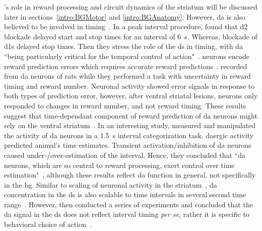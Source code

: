 's role in reward processing and circuit dynamics of the striatum will be discussed later in sections~\ref{intro:BGMotor} and \ref{intro:BGAnatomy}.
However, \gls{da} is also believed to be involved in timing~\cite{Paton2018NeuronRev}.
In a peak interval procedure\footnotemark,  found that \gls{d2} blockade delayed start and stop times for an interval of 6~s.
Whereas, blockade of \glspl{d1} delayed stop times.
Then they stress the role of the \gls{ds} in timing, with \gls{da} ``being particularly critical for the temporal control of action"~\cite{DeCorte2019}.
 neurons encode reward prediction errors which requires accurate reward predictions~\cite[see][]{Berke2018NN}.
 recorded from \gls{da} neurons of rats while they performed a task with uncertainty in reward timing and reward number.
Neuronal activity showed error signals in response to both types of prediction error, however, after ventral striatal lesions, neurons only responded to changes in reward number, and not reward timing.
These results suggest that time-dependant component of reward prediction of \gls{da} neurons might rely on the ventral striatum~\cite{Takahashi2016}.
In an interesting study,  measured and manipulated the activity of \gls{da} neurons in a 1.5~s interval categorization task.
\Gls{da}ergic activity predicted animal's time estimates.
Transient activation/inhibition of \gls{da} neurons caused under-/over-estimation of the interval.
Hence, they concluded that ``\gls{da} neurons, which are so central to reward processing, exert control over time estimation"~\cite{Paton2016Sci}, although these results reflect \gls{da} function in general, not specifically in the \gls{bg}.
Similar to scaling of neuronal activity in the striatum~\cite{Mello2015}, \gls{da} concentration in the \gls{ds} is also scalable to time intervals in several second time range~\cite{Howard2017}.
However, \citeauthor{Howard2017} then conducted a series of experiments and concluded that the \gls{da} signal in the \gls{ds} does not reflect interval timing \textit{per se}, rather it is specific to behavioral choice of action~\cite{Howard2017}.




